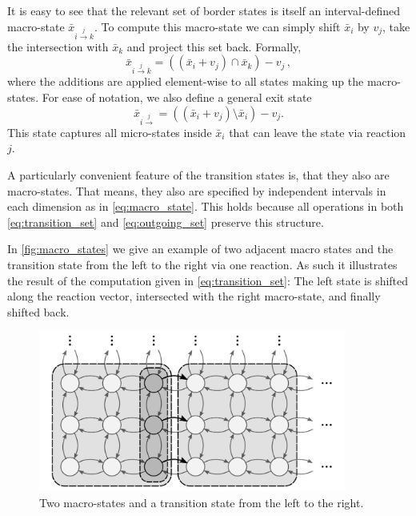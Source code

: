 It is easy to see that the relevant set of border states is itself an
interval-defined macro-state $\bar{x}_{i\xrightarrow{j}k}$.
To compute this macro-state
we can simply shift $\bar{x}_i$ by $v_j$, take the intersection
with $\bar{x}_k$ and project this set back.
Formally,
\begin{equation}\label{eq:transition_set}
  \bar{x}_{i\xrightarrow{j}k} = ((\bar{x}_i + v_j) \cap \bar{x}_k) - v_j\,,
\end{equation}
where the additions are applied element-wise to all states
making up the macro-states.
For ease of notation, we also define a general exit state
\begin{equation}\label{eq:outgoing_set}
  \bar{x}_{i\xrightarrow{j}} = ((\bar{x}_i + v_j) \setminus \bar{x}_i) - v_j.
\end{equation}
This state captures all micro-states inside $\bar{x}_i$ that can
leave the state via reaction $j$.

A particularly convenient feature of the transition states is, that
they also are macro-states.
That means, they also are specified by independent intervals in each
dimension as in \eqref{eq:macro_state}.
This holds because all operations in both \eqref{eq:transition_set}
and \eqref{eq:outgoing_set} preserve this structure.

\begin{example}
  In \autoref{fig:macro_states}
  we give an example of two adjacent macro states and the
  transition state from the left to the right via one reaction.
  As such it illustrates the result of the computation given in
  \eqref{eq:transition_set}:
  The left state is shifted along the reaction vector, intersected
  with the right macro-state, and finally shifted back.
  \begin{figure}[htb]
    \centering
    \includegraphics[width=0.9\textwidth]{gfx/macro_states.pdf}
    \caption[Macro-state transition]{\label{fig:macro_states}Two
    macro-states and a transition state from the left to the right.}
  \end{figure}
\end{example}

